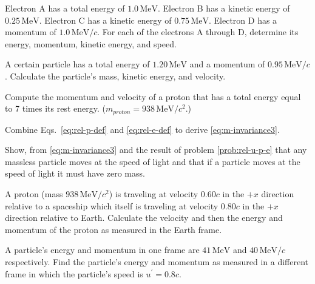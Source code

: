 \begin{exercise}
Electron A has a total energy of $1.0\,\text{MeV}$.  Electron B has a
kinetic energy of $0.25\,\text{MeV}$.  Electron C has a kinetic energy of
$0.75\,\text{MeV}$.  Electron D has a momentum of $1.0\,\text{MeV}/c$.
For each of the electrons A through D, determine its energy, momentum,
kinetic energy, and speed.
\label{prob:electrons}
\end{exercise}

\begin{exercise}
A certain particle has a total energy of $1.20\,\text{MeV}$ and
a momentum of $0.95\,\text{MeV}/c$.  Calculate the particle's mass,
kinetic energy, and velocity.  
\end{exercise}

\begin{exercise}
Compute the momentum and velocity of a proton that has a total
energy equal to 7 times its rest energy.  ($m_{ proton} =
938\,\text{MeV}/c^2$.)
\label{prob:proton}
\end{exercise}

\begin{exercise}
Combine Eqs.~\eqref{eq:rel-p-def} and \eqref{eq:rel-e-def} to derive 
\eqref{eq:m-invariance3}.
\end{exercise}

\begin{exercise}
Show, from \eqref{eq:m-invariance3} and the result of
problem \eqref{prob:rel-u-p-e} that any massless particle moves at
the speed of light and that if a particle moves at the speed of light
it must have zero mass.    
\end{exercise}

\begin{exercise}
A proton (mass $938\,\text{MeV}/c^2$) is traveling at velocity
$0.60c$ in the $+x$ direction relative to a spaceship which itself is
traveling at velocity $0.80c$ in the $+x$ direction relative to Earth.
Calculate the velocity and then the energy and momentum of the proton
as measured in the Earth frame.
\end{exercise}

\begin{exercise}
A particle's energy and momentum in one frame are $41\,\text{MeV}$ and 
$40\,\text{MeV}/c$ respectively.  Find the particle's energy and 
momentum as measured in a different frame in which the particle's speed is 
$u^\prime = 0.8c$.
\label{prob:ep_transform}    
\end{exercise}

